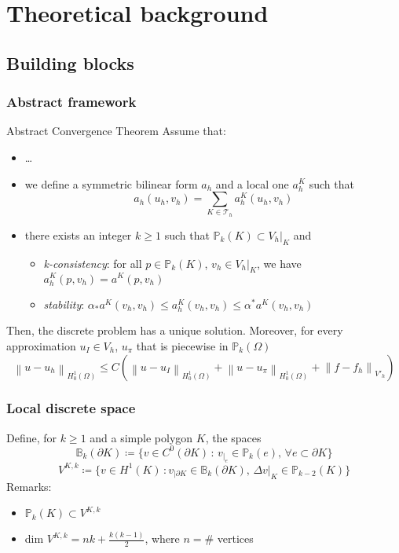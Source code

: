\documentclass[10pt]{beamer}
\newcommand{\norm}[2]{\left\lVert#1\right\rVert_{#2}}
\begin{document}
	
	\section{Theoretical background} 
	\subsection{Building blocks}
	\begin{frame}\frametitle{Abstract framework}
	\begin{block}{Abstract Convergence Theorem}
		Assume that:
		\begin{itemize}
			\item \dots
			\item we define a symmetric bilinear form $a_h$ and a local one $a_h^K$ such that
			$$a_h(u_h,v_h)=\sum_{K \in \mathcal{T}_h} a_h^K(u_h,v_h)$$
			\item there exists an integer $k\geq 1$ such that $\mathbb{P}_k(K) \subset V_h|_K$ and
			\begin{itemize}
				\item \textit{k-consistency}: for all $p \in \mathbb{P}_k(K)$, $v_h \in V_h|_K$, we have $a_h^K(p,v_h)=a^K(p,v_h)$
				\item\textit{stability}:
				$\alpha_{*}a^K(v_h,v_h) \leq a_h^K(v_h,v_h) \leq \alpha^{*}a^K(v_h,v_h)$
			\end{itemize}
		\end{itemize}
	\vspace{0.25cm}
	Then, the discrete problem has a unique solution.
	Moreover, for every approximation $u_I \in V_h$, $u_\pi$ that is piecewise in $\mathbb{P}_k(\Omega)$
	$$\norm{u-u_h}{H_0^1(\Omega)} \leq C \left( 
	\norm{u-u_I}{H_0^1(\Omega)}+\norm{u-u_\pi}{H_0^1(\Omega)}+\norm{f-f_h}{V'_h} \right)
	$$
	\end{block}
	\end{frame}
	
	\begin{frame} \frametitle{Local discrete space}
		Define, for $k \geq 1$ and a simple polygon $K$, the spaces
		\begin{equation*}
		\mathbb{B}_k(\partial K) \coloneqq \lbrace v \in C^0(\partial K) \, : \, v_{|_e} \in \mathbb{P}_k(e), \, \forall e \subset \partial K \rbrace
		\end{equation*}
		\begin{equation*}
		V^{K,k} \coloneqq \lbrace v \in H^1(K) \, : v_{|\partial K} \in \mathbb{B}_k(\partial K), \, \Delta v |_K \in \mathbb{P}_{k-2}(K) \rbrace
		\label{eqn:VKk}
		\end{equation*}
		Remarks: 
		\begin{itemize}
			\item $\mathbb{P}_k(K) \subset V^{K,k}$
			\item dim $V^{K,k}= n k + \frac{k(k-1)}{2}$, where $n=\#$ vertices
		\end{itemize}
	\end{frame}	
\end{document}
